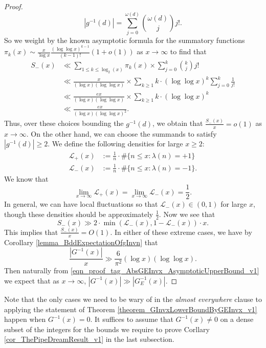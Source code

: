 \documentclass[11pt,reqno,a4letter]{article}
\numberwithin{figure}{section}
\numberwithin{table}{section}
\newcommand{\cf}{\textit{cf.\ }}
\theoremstyle{plain}
\numberwithin{theorem}{section}
\theoremstyle{definition}
\begin{document}
\begin{proof}
\[
|g^{-1}(d)| = \sum_{j=0}^{\omega(d)} \binom{\omega(d)}{j} j!. 
\]
So we weight by the known asymptotic formula for the summatory functions 
$\pi_k(x) \sim \frac{x}{\log x} \frac{(\log\log x)^{k-1}}{(k-1)!}(1+o(1))$ as $x \rightarrow \infty$ 
to find that 
\begin{align*} 
S_{-}(x) & \ll \sum_{1 \leq k \leq \log_2(x)} \pi_k(x) \times \sum_{j=0}^{k} \binom{k}{j} j! \\ 
     & \ll \frac{x}{(\log x) (\log\log x)} \times \sum_{k \geq 1} k \cdot (\log\log x)^{k} \sum_{j=0}^{k} \frac{1}{j!} \\ 
     & \ll \frac{ex}{(\log x) (\log\log x)} \times \sum_{k \geq 1} k \cdot (\log\log x)^{k} \\ 
     & \ll \frac{ex}{(\log x) (\log\log x)^2}. 
\end{align*} 
Thus, over these choices bounding the $g^{-1}(d)$, we obtain that 
$\frac{S_{-}(x)}{x} = o(1)$ as $x \rightarrow \infty$. 
On the other hand, we can choose the summands to satisfy $|g^{-1}(d)| \geq 2$. 
We define the following densities for large $x \geq 2$: 
\begin{align*} 
\mathcal{L}_{+}(x) & := \frac{1}{n} \cdot \#\{n \leq x: \lambda(n) = +1\} \\ 
\mathcal{L}_{-}(x) & := \frac{1}{n} \cdot \#\{n \leq x: \lambda(n) = -1\}. 
\end{align*} 
We know that \cite[\cf \S 1]{TAO-VALUEPATTERNS} 
\[
\lim_{x \rightarrow \infty} \mathcal{L}_{+}(x) = \lim_{x \rightarrow \infty} \mathcal{L}_{-}(x) = 
     \frac{1}{2}. 
\]
In general, we can have local fluctuations so that $\mathcal{L}_{-}(x) \in (0, 1)$ for large $x$, though 
these densities should be approximately $\frac{1}{2}$. 
Now we see that 
\[
S_{-}(x) \gg 2 \cdot \min\left(\mathcal{L}_{-}(x), 1 - \mathcal{L}_{-}(x)\right) \cdot x. 
\]
This implies that $\frac{S_{-}(x)}{x} = O(1)$. In either of these extreme cases, we have by 
Corollary \ref{lemma_BddExpectationOfgInvn} that 
\[
\frac{|G^{-1}(x)|}{x} \gg \frac{6}{\pi^2} (\log x) (\log\log x). 
\]
Then naturally from \eqref{eqn_proof_tag_AbsGEInvx_AsymptoticUpperBound_v1} we 
expect that as $x \rightarrow \infty$, 
$|G^{-1}(x)| \gg |G_E^{-1}(x)|$. 
\end{proof} 

Note that the only cases we need to be wary of in the \emph{almost everywhere} clause 
to applying the statement of 
Theorem \ref{theorem_GInvxLowerBoundByGEInvx_v1} 
happen when $G^{-1}(x) = 0$. 
It suffices to assume that $G^{-1}(x) \neq 0$ on a dense subset of the integers for the 
bounds we require to prove 
Corllary \ref{cor_ThePipeDreamResult_v1} 
in the last subsection. 
\end{document}
